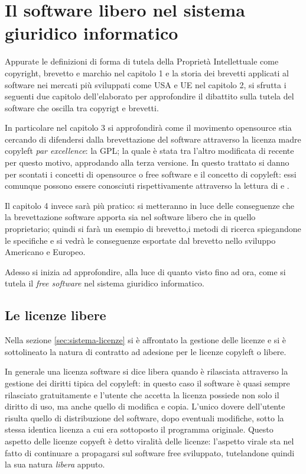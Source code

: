  \chapter{Il software libero nel sistema giuridico informatico}

Appurate le definizioni di forma di tutela della Proprietà Intellettuale come copyright, brevetto e marchio nel capitolo 1 e la storia dei brevetti applicati al software nei mercati più sviluppati come USA e UE nel capitolo 2, si sfrutta i seguenti due capitolo dell'elaborato per approfondire il dibattito sulla tutela del software che oscilla tra copyrigt e brevetti.

In particolare nel capitolo 3 si approfondirà come il movimento opensource stia cercando di difendersi dalla brevettazione del software attraverso la licenza madre copyleft \textit{par excellence}: la GPL; la quale è stata tra l'altro modificata di recente per questo motivo, approdando alla terza versione.
In questo trattato si danno per scontati i concetti di opensource o free software e il concetto di copyleft: essi comunque possono essere conosciuti rispettivamente attraverso la lettura di \cite[Compendio di libertà informatica e cultura open]{Aliprandi-compendio} e \cite[Copyleft e Opencontent]{Aliprandi-copyleft}.

Il capitolo 4 invece sarà più pratico: si metteranno in luce delle conseguenze che la brevettazione software apporta sia nel software libero che in quello proprietario; quindi si farà un esempio di brevetto,i metodi di ricerca spiegandone le specifiche e si vedrà le conseguenze esportate dal brevetto nello sviluppo Americano e Europeo.

Adesso si inizia ad approfondire, alla luce di quanto visto fino ad ora, come si tutela il \textit{free software} nel sistema giuridico informatico.


\section{Le licenze libere}

Nella sezione \ref{sec:sistema-licenze} si è affrontato la gestione delle licenze e si è sottolineato la natura di contratto ad adesione per le licenze copyleft o libere.

In generale una licenza software si dice libera quando è rilasciata attraverso la gestione dei diritti tipica del copyleft: in questo caso il software è quasi sempre rilasciato gratuitamente e l'utente che accetta la licenza possiede non solo il diritto di uso, ma anche quello di modifica e copia. L'unico dovere dell'utente risulta quello di distribuzione del software, dopo eventuali modifiche, sotto la stessa identica licenza a cui era sottoposto il programma originale. Questo aspetto delle licenze copyeft è detto viralità delle licenze: l'aspetto virale sta nel fatto di continuare a propagarsi sul software free sviluppato, tutelandone quindi la sua natura \textit{libera} apputo.

